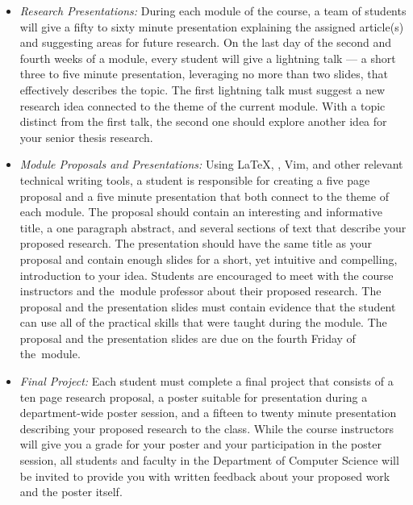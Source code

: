 \begin{itemize}
\item {\em Research Presentations:} During each module of the course, a team of students will give a fifty to sixty
  minute presentation explaining the assigned article(s) and suggesting areas for future research. On the last day of
  the second and fourth weeks of a module, every student will give a lightning talk --- a short three to five minute
  presentation, leveraging no more than two slides, that effectively describes the topic. The first lightning talk must
  suggest a new research idea connected to the theme of the current module. With a topic distinct from the first talk,
  the second one should explore another idea for your senior thesis research.

\item {\em Module Proposals and Presentations:} Using \LaTeX, \BibTeX, Vim, and other relevant technical writing tools,
  a student is responsible for creating a five page proposal and a five minute presentation that both connect to the
  theme of each module. The proposal should contain an interesting and informative title, a one paragraph abstract, and
  several sections of text that describe your proposed research. The presentation should have the same title as your
  proposal and contain enough slides for a short, yet intuitive and compelling, introduction to your idea.  Students are
  encouraged to meet with the course instructors and \mbox{the module} professor about their proposed research.  The
  proposal and the presentation slides must contain evidence that the student can use all of the practical skills that
  were taught during the module.  The proposal and the presentation slides are due on the fourth Friday of \mbox{the
    module}.



\item {\em Final Project:} Each student must complete a final project that consists of a ten page research proposal, a
  poster suitable for presentation during a department-wide poster session, and a fifteen to twenty minute presentation
  describing your proposed research to the class. While the course instructors will give you a grade for your poster and
  your participation in the poster session, all students and faculty in the Department of Computer Science will be
  invited to provide you with written feedback about your proposed work and the poster itself.

\end{itemize}

